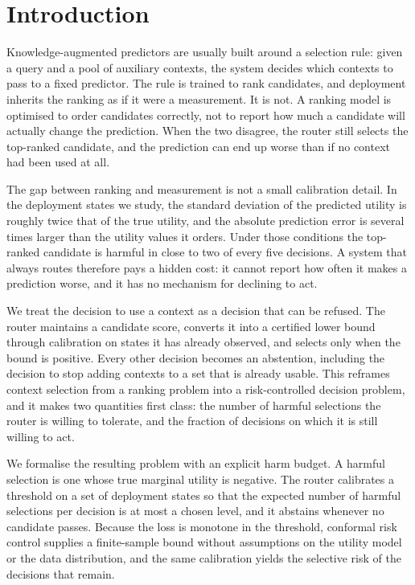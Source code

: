 \section{Introduction}

Knowledge-augmented predictors are usually built around a selection rule:
given a query and a pool of auxiliary contexts, the system decides which
contexts to pass to a fixed predictor. The rule is trained to rank candidates,
and deployment inherits the ranking as if it were a measurement. It is not. A
ranking model is optimised to order candidates correctly, not to report how
much a candidate will actually change the prediction. When the two disagree,
the router still selects the top-ranked candidate, and the prediction can end
up worse than if no context had been used at all.

The gap between ranking and measurement is not a small calibration detail. In
the deployment states we study, the standard deviation of the predicted
utility is roughly twice that of the true utility, and the absolute prediction
error is several times larger than the utility values it orders. Under those
conditions the top-ranked candidate is harmful in close to two of every five
decisions. A system that always routes therefore pays a hidden cost: it cannot
report how often it makes a prediction worse, and it has no mechanism for
declining to act.

We treat the decision to use a context as a decision that can be refused. The
router maintains a candidate score, converts it into a certified lower bound
through calibration on states it has already observed, and selects only when
the bound is positive. Every other decision becomes an abstention, including
the decision to stop adding contexts to a set that is already usable. This
reframes context selection from a ranking problem into a risk-controlled
decision problem, and it makes two quantities first class: the number of
harmful selections the router is willing to tolerate, and the fraction of
decisions on which it is still willing to act.

We formalise the resulting problem with an explicit harm budget. A harmful
selection is one whose true marginal utility is negative. The router
calibrates a threshold on a set of deployment states so that the expected
number of harmful selections per decision is at most a chosen level, and it
abstains whenever no candidate passes. Because the loss is monotone in the
threshold, conformal risk control supplies a finite-sample bound without
assumptions on the utility model or the data distribution, and the same
calibration yields the selective risk of the decisions that remain.

